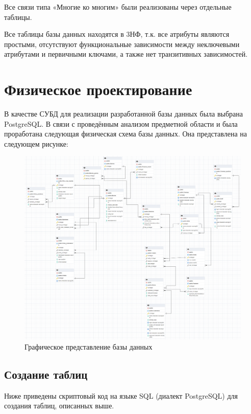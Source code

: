 \documentclass[a4paper,12pt]{article}
\renewcommand{\^}[2]{#1^{\, #2} \kern -1pt}
\newcommand{\1}{\kern 1pt}
\newcommand{\0}{\kern -1pt}
\begin{document}
	Все связи типа «Многие ко многим» были реализованы через отдельные таблицы.
	
	Все таблицы базы данных находятся в 3НФ, т.к. все атрибуты являются простыми, отсутствуют функциональные зависимости между неключевыми атрибутами и первичными ключами, а также нет транзитивных зависимостей.
	
	\newpage
	
	\section{Физическое проектирование}
	
	В качестве СУБД для реализации разработанной базы данных была выбрана PostgreSQL. В связи с проведённым анализом предметной области и была проработана следующая физическая схема базы данных. Она представлена на следующем рисунке:
	
	\begin{figure}[h]
		\hspace{-1.75cm}
		\includegraphics[scale=0.5,page=1]{Графическое представление.png}
		\caption{Графическое представление базы данных}
	\end{figure}
	
	\newpage
	
	\subsection{Создание таблиц}	
	
	Ниже приведены скриптовый код на языке SQL (диалект PostgreSQL) для создания таблиц, описанных выше.
	
\end{document}

